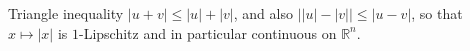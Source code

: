 \documentclass[11pt]{article}
\begin{document}
\pagestyle{empty}

Triangle inequality $|u + v| \le |u| + |v|$, and also $\bigl| |u| - |v| \bigr| \le |u - v|$, so that $x \mapsto |x|$ is $1$-Lipschitz and in particular continuous on $\mathbb{R}^n$.
\end{document}
